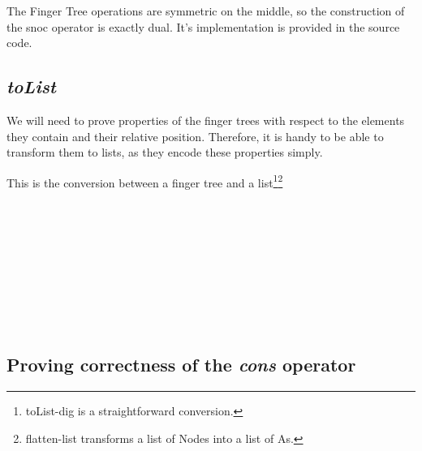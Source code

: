 \documentclass[12pt,twoside,notitlepage]{report}
\begin{document}
The Finger Tree operations are symmetric on the middle, so the construction of the snoc operator is exactly dual. It's implementation is provided in the source code.

\subsection{\textit{toList}}

We will need to prove properties of the finger trees with respect to the elements they contain and their relative position. Therefore, it is handy to be able to transform them to lists, as they encode these properties simply.


This is the conversion between a finger tree and a list\footnote{
toList-dig is a straightforward conversion.}\footnote{flatten-list transforms a list of Nodes into a list of As.}

\begin{code}
\\
\> \AgdaSymbol{:}  \AgdaSymbol{\{}\AgdaSymbol{\}\{} \AgdaSymbol{:}  \AgdaSymbol{\}\{} \AgdaSymbol{:}   \AgdaSymbol{\}}\<%
\\
\>[0]\<[10]%
\>[10]  \AgdaSymbol{:}   \<%
\\
\>[0]\<[10]%
\>[10]  \AgdaSymbol{:}     \AgdaSymbol{\{} \AgdaSymbol{:} \AgdaSymbol{\}}\<%
\\
\>[0]\<[10]%
\>[10]    \AgdaSymbol{\{}\AgdaSymbol{\}}\<%
\\
\>[0]\<[10]%
\>[10]  \<%
\\
\>  \AgdaSymbol{=} \AgdaInductiveConstructor{[]}\<%
\\
\> \AgdaSymbol{(} \AgdaSymbol{)} \AgdaSymbol{=}   \AgdaInductiveConstructor{[]}\<%
\\
\end{code}

\subsection{Proving correctness of the \textit{cons} operator}
\end{document}
